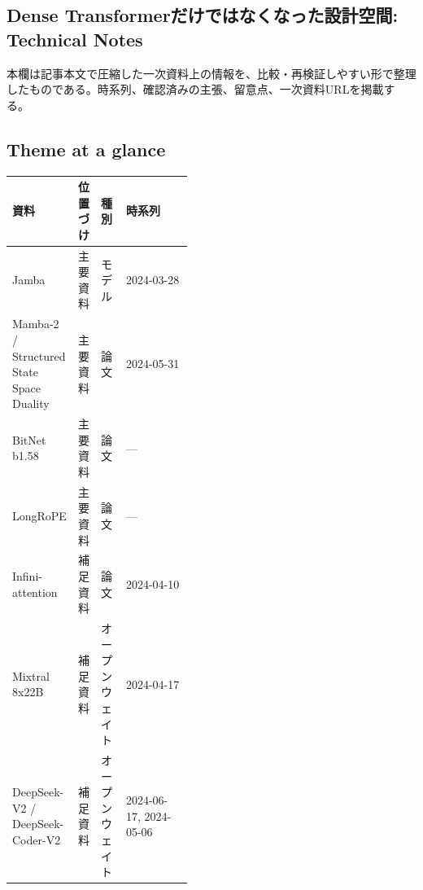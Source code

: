 \subsection*{Dense Transformerだけではなくなった設計空間: Technical Notes}
本欄は記事本文で圧縮した一次資料上の情報を、比較・再検証しやすい形で整理したものである。時系列、確認済みの主張、留意点、一次資料URLを掲載する。
\smallskip
{}\par
\medskip
\subsection*{Theme at a glance}
\begin{center}
\footnotesize
\begin{tabularx}{\linewidth}{@{}p{0.20\linewidth}p{0.10\linewidth}p{0.14\linewidth}X@{}}
\toprule
資料 & 位置づけ & 種別 & 時系列 \\
\midrule
Jamba & 主要資料 & モデル & 2024-03-28     \\
Mamba-2 / Structured State Space Duality & 主要資料 & 論文 & 2024-05-31     \\
BitNet b1.58 & 主要資料 & 論文 & — \\
LongRoPE & 主要資料 & 論文 & — \\
Infini-attention & 補足資料 & 論文 & 2024-04-10     \\
Mixtral 8x22B & 補足資料 & オープンウェイト & 2024-04-17     \\
DeepSeek-V2 / DeepSeek-Coder-V2 & 補足資料 & オープンウェイト & 2024-06-17, 2024-05-06     \\
\bottomrule
\end{tabularx}
\end{center}
\normalsize

